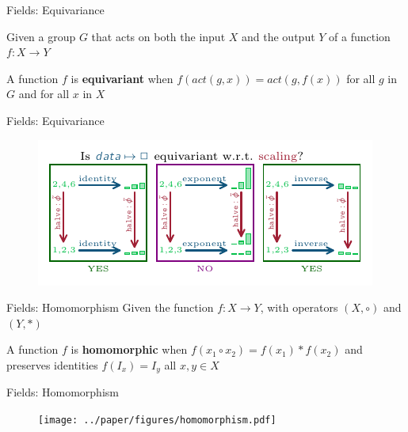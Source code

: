 \documentclass[xcolor={dvipsnames}]{beamer}
\begin{document}
\begin{frame}{Fields: Equivariance }

    Given a group $G$ that acts on both the input $X$ and the output $Y$ of a function $f: X \rightarrow Y$
    \begin{definition}\label{def:equivariance}
     A function $f$ is \textbf{equivariant} when $f(act(g,x)) = act(g,f(x))$ for all $g$ in $G$ and for all $x$ in $X$ \cite{pittsNominalSetsNames2013}
    \end{definition}
\end{frame}
\begin{frame}{Fields: Equivariance}
    \begin{figure}
        \includegraphics[width=\linewidth]{../paper/figures/equivariant.pdf}
        \label{fig:related-work:equivariance}
      \end{figure}
\end{frame}

\begin{frame}{Fields: Homomorphism}
    Given the function $f: X \rightarrow Y$, with operators $(X, \circ)$ and $(Y, *)$

    \begin{definition}\label{def:homomorphism}
      A function $f$ is \textbf{homomorphic} when $f(x_1 \circ x_2) = f(x_1) * f(x_2)$ and preserves identities $f(I_x) = I_y$ all $x, y \in X$ \cite{grimaldiDiscreteCombinatorialMathematics2006}
    \end{definition}
\end{frame}


\begin{frame}{Fields: Homomorphism}

    \begin{figure}
        \texttt{[image: ../paper/figures/homomorphism.pdf]}
        \label{fig:related-work:homomorphism}
      \end{figure}
\end{frame}
\end{document}
